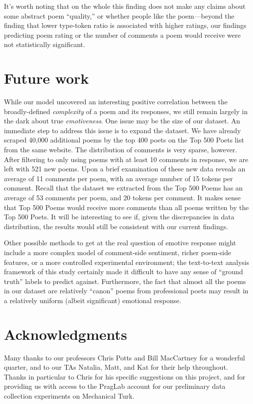 \documentclass[11pt]{article}
\begin{document}
It's worth noting that on the whole this finding does not make any claims about some abstract poem ``quality,'' or whether people like the poem---beyond the finding that lower type-token ratio is associated with higher ratings, our findings predicting poem rating or the number of comments a poem would receive were not statistically significant. 

\section{Future work}

While our model uncovered an interesting positive correlation between the broadly-defined \emph{complexity} of a poem and its responses, we still remain largely in the dark about true \emph{emotiveness}. One issue may be the size of our dataset. An immediate step to address this issue is to expand the dataset. We have already scraped 40,000 additional poems by the top 400 poets on the Top 500 Poets list from the same website. The distribution of comments is very sparse, however. After filtering to only using poems with at least 10 comments in response, we are left with 521 new poems. Upon a brief examination of these new data reveals an average of 11 comments per poem, with an average number of 15 tokens per comment. Recall that the dataset we extracted from the Top 500 Poems has an average of 53 comments per poem, and 20 tokens per comment. It makes sense that Top 500 Poems would receive more comments than all poems written by the Top 500 Poets. It will be interesting to see if, given the discrepancies in data distribution, the results would still be consistent with our current findings.

Other possible methods to get at the real question of emotive response might include a more complex model of comment-side sentiment, richer poem-side features, or a more controlled experimental environment; the text-to-text analysis framework of this study certainly made it difficult to have any sense of ``ground truth'' labels to predict against. Furthermore, the fact that almost all the poems in our dataset are relatively ``canon'' poems from professional poets may result in a relatively uniform (albeit significant) emotional response. 



\section*{Acknowledgments}

Many thanks to our professors Chris Potts and Bill MacCartney for a wonderful quarter, and to our TAs Natalia, Matt, and Kat for their help throughout. Thanks in particular to Chris for his specific suggestions on this project, and for providing us with access to the PragLab account for our preliminary data collection experiments on Mechanical Turk.




\end{document}
